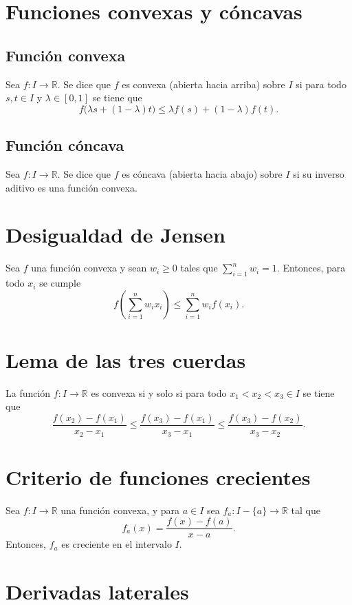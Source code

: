 \documentclass{article}
\begin{document}
\section*{Funciones convexas y cóncavas}

\subsection*{Función convexa}
Sea $f:I\to\mathbb{R}$. Se dice que $f$ es convexa (abierta hacia arriba) sobre $I$ si para todo $s,t\in I$ y $\lambda\in[0,1]$ se tiene que
$$f\big(\lambda s+(1-\lambda)t\big)\leq \lambda f(s)+(1-\lambda)f(t).$$

\subsection*{Función cóncava}
Sea $f:I\to\mathbb{R}$. Se dice que $f$ es cóncava (abierta hacia abajo) sobre $I$ si su inverso aditivo es una función convexa.

\section*{Desigualdad de Jensen}

Sea $f$ una función convexa y sean $w_i\geq 0$ tales que $\displaystyle\sum_{i=1}^{n}w_i=1$. Entonces, para todo $x_i$ se cumple
$$f\left(\sum_{i=1}^{n}w_ix_i\right)\leq \sum_{i=1}^{n}w_if(x_i).$$

\section*{Lema de las tres cuerdas}

La función $f:I\to\mathbb{R}$ es convexa si y solo si para todo $x_1<x_2<x_3\in I$ se tiene que
$$\frac{f(x_2)-f(x_1)}{x_2-x_1}\leq\frac{f(x_3)-f(x_1)}{x_3-x_1}\leq\frac{f(x_3)-f(x_2)}{x_3-x_2}.$$ 

\section*{Criterio de funciones crecientes}

Sea $f:I\to\mathbb{R}$ una función convexa, y para $a\in I$ sea $f_a:I-\{a\}\to\mathbb{R}$ tal que
$$f_a(x)=\frac{f(x)-f(a)}{x-a}.$$
Entonces, $f_a$ es creciente en el intervalo $I$.

\section*{Derivadas laterales}
\end{document}
